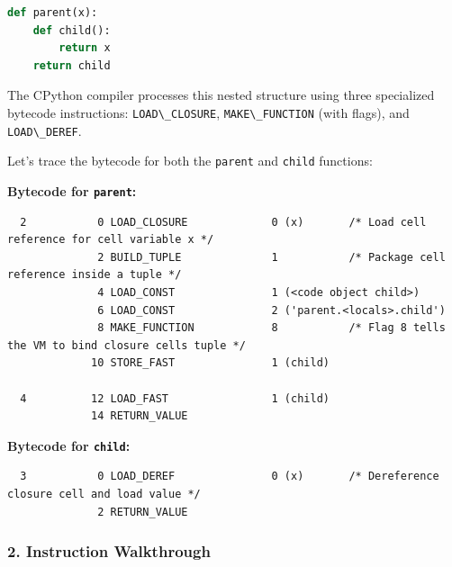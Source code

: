 \begin{lstlisting}[language=Python]
def parent(x):
    def child():
        return x
    return child
\end{lstlisting}

The CPython compiler processes this nested structure using three
specialized bytecode instructions:
\passthrough{\lstinline!LOAD\_CLOSURE!},
\passthrough{\lstinline!MAKE\_FUNCTION!} (with flags), and
\passthrough{\lstinline!LOAD\_DEREF!}.

Let's trace the bytecode for both the \passthrough{\lstinline!parent!}
and \passthrough{\lstinline!child!} functions:

\textbf{Bytecode for \passthrough{\lstinline!parent!}:}

\begin{lstlisting}
  2           0 LOAD_CLOSURE             0 (x)       /* Load cell reference for cell variable x */
              2 BUILD_TUPLE              1           /* Package cell reference inside a tuple */
              4 LOAD_CONST               1 (<code object child>)
              6 LOAD_CONST               2 ('parent.<locals>.child')
              8 MAKE_FUNCTION            8           /* Flag 8 tells the VM to bind closure cells tuple */
             10 STORE_FAST               1 (child)

  4          12 LOAD_FAST                1 (child)
             14 RETURN_VALUE
\end{lstlisting}

\textbf{Bytecode for \passthrough{\lstinline!child!}:}

\begin{lstlisting}
  3           0 LOAD_DEREF               0 (x)       /* Dereference closure cell and load value */
              2 RETURN_VALUE
\end{lstlisting}

\hypertarget{instruction-walkthrough}{%
\subsubsection{2. Instruction
Walkthrough}\label{instruction-walkthrough}}

